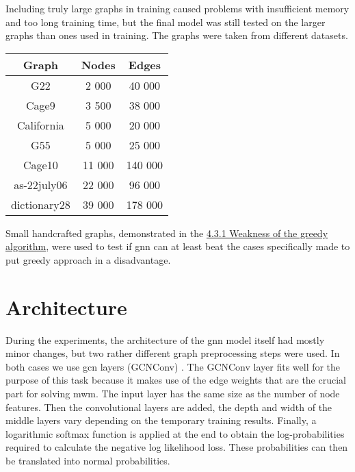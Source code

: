 Including truly large graphs in training caused problems with insufficient memory and too long training time, but the final model was still tested on the larger graphs than ones used in training. The graphs were taken from different datasets.

\begin{center}
\begin{tabular}{||c | c | c||} 
\hline
 Graph & Nodes & Edges \\ [0.5ex] 
 \hline\hline
 G22 & 2 000 & 40 000 \\
 \hline
 Cage9 & 3 500 & 38 000 \\
 \hline
 California & 5 000 & 20 000 \\
 \hline
 G55 & 5 000 & 25 000 \\
 \hline
 Cage10 & 11 000 & 140 000 \\
 \hline
 as-22july06 & 22 000 & 96 000 \\
 \hline
 dictionary28 & 39 000 & 178 000 \\ [1ex] 
 \hline
\end{tabular}
\end{center}

Small handcrafted graphs, demonstrated in the \hyperref[sec:greedybadcase]{4.3.1 Weakness of the greedy algorithm}, were used to test if \gls{gnn} can at least beat the cases specifically made to put greedy approach in a disadvantage.

\section{Architecture}
\label{sec:architecture}
During the experiments, the architecture of the \gls{gnn} model itself had mostly minor changes, but two rather different graph preprocessing steps were used. In both cases we use \gls{gcn} layers (GCNConv) \cite{gcnpaper}. The GCNConv layer fits well for the purpose of this task because it makes use of the edge weights that are the crucial part for solving \gls{mwm}. The input layer has the same size as the number of node features. Then the convolutional layers are added, the depth and width of the middle layers vary depending on the temporary training results. Finally, a logarithmic softmax function is applied at the end to obtain the log-probabilities required to calculate the negative log likelihood loss. These probabilities can then be translated into normal probabilities. 

